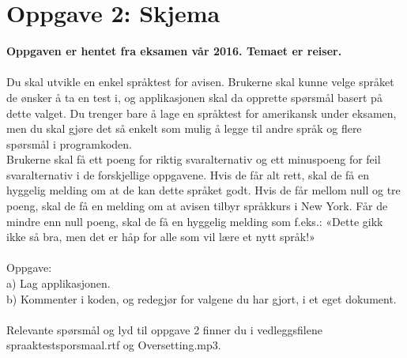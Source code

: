 \documentclass[a4paper, norsk, 10pt]{article}
\begin{document}
\section*{Oppgave 2: Skjema}
\textbf{Oppgaven er hentet fra eksamen vår 2016. Temaet er reiser.} \\
\ \\
Du skal utvikle en enkel språktest for avisen. Brukerne skal kunne velge språket de ønsker å ta en test i, og applikasjonen skal da opprette spørsmål basert på dette valget.
Du trenger bare å lage en språktest for amerikansk under eksamen, men du skal gjøre det så enkelt som mulig å legge til andre språk og flere spørsmål i programkoden.\\
Brukerne skal få ett poeng for riktig svaralternativ og ett minuspoeng for feil svaralternativ i de forskjellige oppgavene. Hvis de får alt rett, skal de få en hyggelig melding om at de kan dette språket godt. Hvis de får mellom null og tre poeng, skal de få en melding om at avisen tilbyr språkkurs i New York. Får de mindre enn null poeng, skal de få en hyggelig melding som f.eks.: «Dette gikk ikke så bra, men det er håp for alle som vil lære et nytt språk!»\\
\ \\
Oppgave:\\
a) Lag applikasjonen.\\
b) Kommenter i koden, og redegjør for valgene du har gjort, i et eget dokument.\\
\ \\
Relevante spørsmål og lyd til oppgave 2 finner du i vedleggsfilene spraaktestsporsmaal.rtf og Oversetting.mp3.\\
\end{document}
